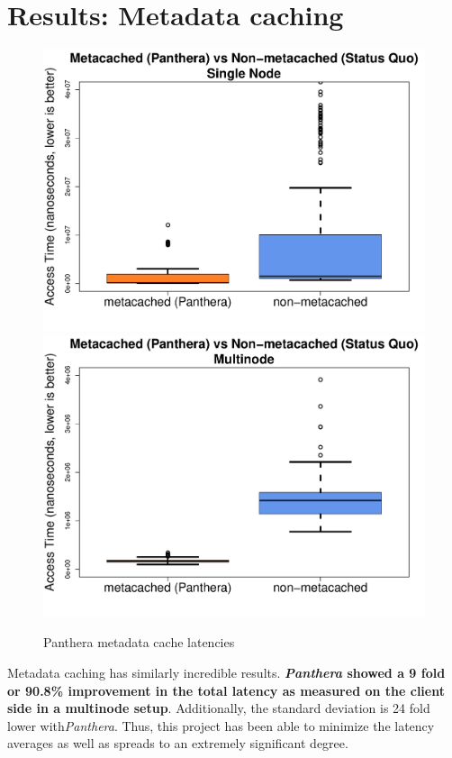 \documentclass[12pt]{article}
\begin{document}
\section{Results: Metadata caching}
\begin{figure}[!h]
	\caption{Panthera metadata cache latencies}
	\centering
		\includegraphics[scale=0.3]{assets/box-plot-metadata.pdf}
		\includegraphics[scale=0.3]{assets/box-plot-metadata-multinode.pdf}
\end{figure}

Metadata caching has similarly incredible results. \textbf{\textit{Panthera} showed a 9 fold or 90.8\% improvement in the total latency as measured on the client side in a multinode setup}. Additionally, the standard deviation is 24 fold lower with\textit{Panthera}. Thus, this project has been able to minimize the latency averages as well as spreads to an extremely significant degree.
\end{document}
